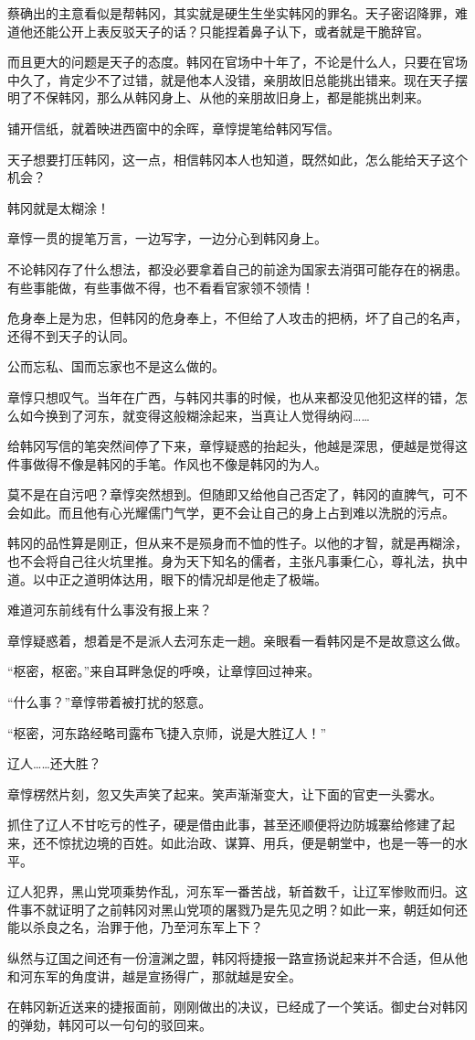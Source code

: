蔡确出的主意看似是帮韩冈，其实就是硬生生坐实韩冈的罪名。天子密诏降罪，难道他还能公开上表反驳天子的话？只能捏着鼻子认下，或者就是干脆辞官。

而且更大的问题是天子的态度。韩冈在官场中十年了，不论是什么人，只要在官场中久了，肯定少不了过错，就是他本人没错，亲朋故旧总能挑出错来。现在天子摆明了不保韩冈，那么从韩冈身上、从他的亲朋故旧身上，都是能挑出刺来。

铺开信纸，就着映进西窗中的余晖，章惇提笔给韩冈写信。

天子想要打压韩冈，这一点，相信韩冈本人也知道，既然如此，怎么能给天子这个机会？

韩冈就是太糊涂！

章惇一贯的提笔万言，一边写字，一边分心到韩冈身上。

不论韩冈存了什么想法，都没必要拿着自己的前途为国家去消弭可能存在的祸患。有些事能做，有些事做不得，也不看看官家领不领情！

危身奉上是为忠，但韩冈的危身奉上，不但给了人攻击的把柄，坏了自己的名声，还得不到天子的认同。

公而忘私、国而忘家也不是这么做的。

章惇只想叹气。当年在广西，与韩冈共事的时候，也从来都没见他犯这样的错，怎么如今换到了河东，就变得这般糊涂起来，当真让人觉得纳闷……

给韩冈写信的笔突然间停了下来，章惇疑惑的抬起头，他越是深思，便越是觉得这件事做得不像是韩冈的手笔。作风也不像是韩冈的为人。

莫不是在自污吧？章惇突然想到。但随即又给他自己否定了，韩冈的直脾气，可不会如此。而且他有心光耀儒门气学，更不会让自己的身上占到难以洗脱的污点。

韩冈的品性算是刚正，但从来不是殒身而不恤的性子。以他的才智，就是再糊涂，也不会将自己往火坑里推。身为天下知名的儒者，主张凡事秉仁心，尊礼法，执中道。以中正之道明体达用，眼下的情况却是他走了极端。

难道河东前线有什么事没有报上来？

章惇疑惑着，想着是不是派人去河东走一趟。亲眼看一看韩冈是不是故意这么做。

“枢密，枢密。”来自耳畔急促的呼唤，让章惇回过神来。

“什么事？”章惇带着被打扰的怒意。

“枢密，河东路经略司露布飞捷入京师，说是大胜辽人！”

辽人……还大胜？

章惇楞然片刻，忽又失声笑了起来。笑声渐渐变大，让下面的官吏一头雾水。

抓住了辽人不甘吃亏的性子，硬是借由此事，甚至还顺便将边防城寨给修建了起来，还不惊扰边境的百姓。如此治政、谋算、用兵，便是朝堂中，也是一等一的水平。

辽人犯界，黑山党项乘势作乱，河东军一番苦战，斩首数千，让辽军惨败而归。这件事不就证明了之前韩冈对黑山党项的屠戮乃是先见之明？如此一来，朝廷如何还能以杀良之名，治罪于他，乃至河东军上下？

纵然与辽国之间还有一份澶渊之盟，韩冈将捷报一路宣扬说起来并不合适，但从他和河东军的角度讲，越是宣扬得广，那就越是安全。

在韩冈新近送来的捷报面前，刚刚做出的决议，已经成了一个笑话。御史台对韩冈的弹劾，韩冈可以一句句的驳回来。

